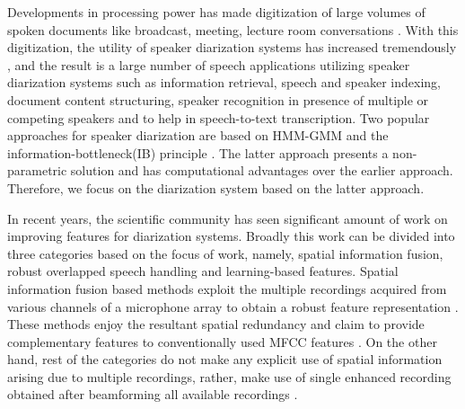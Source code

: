 \documentclass[conference]{IEEEtran}
\begin{document}
Developments in processing power has made digitization of large volumes
of spoken documents like broadcast, meeting, lecture room conversations
\cite{reviewPaper2,reviewPaper3}. With this digitization, the utility of speaker
diarization systems has increased tremendously \cite{reviewPaper1,reviewPaper4},
and the result is a large number of speech applications utilizing speaker
diarization systems such as information retrieval, speech and speaker indexing,
document content structuring, speaker recognition in presence of multiple or
competing speakers and to help in speech-to-text transcription. Two popular
approaches for speaker diarization are based on HMM-GMM \cite{reviewPaper1} and
the information-bottleneck(IB) principle \cite{aIB2}. The latter approach
presents a non-parametric solution and has computational advantages over the
earlier approach. Therefore, we focus on the diarization system based on the
latter approach.  

In recent years, the scientific community has seen significant amount of work on
improving features for diarization systems. Broadly this work can be divided
into three categories based on the focus of work, namely, spatial information
fusion, robust overlapped speech handling and learning-based features. Spatial
information fusion based methods exploit the multiple recordings acquired from
various channels of a microphone array to obtain a robust feature representation
\cite{aIB3,aIB4,featAngle,speakerUPM,featSpatial,MDM}. These methods enjoy the
resultant spatial redundancy and claim to provide complementary features to
conventionally used MFCC features \cite{MDM}. On the other hand, rest of the
categories do not make any explicit use of spatial information arising due to
multiple recordings, rather, make use of single enhanced recording obtained
after beamforming all available recordings \cite{beamforming}. 
\end{document}
